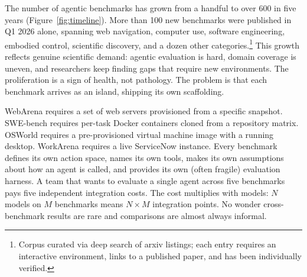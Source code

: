 \documentclass{article}
\begin{document}
%
%

The number of agentic benchmarks has grown from a handful to over 600 in five years
(Figure~\ref{fig:timeline}). More than 100 new benchmarks were published in Q1 2026 alone,
spanning web navigation, computer use, software engineering, embodied control, scientific
discovery, and a dozen other categories.\footnote{%
  Corpus curated via deep search of arxiv listings; each entry requires an interactive
  environment, links to a published paper, and has been individually verified.}
This growth reflects genuine scientific demand: agentic evaluation is hard, domain coverage
is uneven, and researchers keep finding gaps that require new environments. The
proliferation is a sign of health, not pathology. The problem is that each benchmark
arrives as an island, shipping its own scaffolding.

WebArena requires a set of web servers
provisioned from a specific snapshot. SWE-bench requires per-task Docker containers cloned
from a repository matrix. OSWorld requires a pre-provisioned virtual machine image with a
running desktop. WorkArena requires a live ServiceNow instance. Every benchmark defines its
own action space, names its own tools, makes its own assumptions about how an agent is
called, and provides its own (often fragile) evaluation harness. A team that wants to
evaluate a single agent across five benchmarks pays five independent integration costs.
The cost multiplies with models: $N$ models on $M$ benchmarks means $N \times M$
integration points. No wonder cross-benchmark results are rare and comparisons are almost
always informal.
\end{document}

